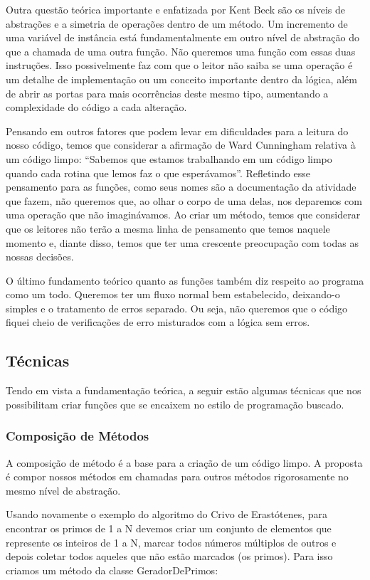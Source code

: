 Outra questão teórica importante e enfatizada por Kent Beck são os níveis de abstrações e a simetria de operações dentro de um método. Um incremento de uma variável de instância está fundamentalmente em outro nível de abstração do que a chamada de uma outra função. Não queremos uma função com essas duas instruções. Isso possivelmente faz com que o leitor não saiba se uma operação é um detalhe de implementação ou um conceito importante dentro da lógica, além de abrir as portas para mais ocorrências deste mesmo tipo, aumentando a complexidade do código a cada alteração.
	
Pensando em outros fatores que podem levar em dificuldades para a leitura do nosso código, temos que considerar a afirmação de Ward Cunningham relativa à um código limpo: “Sabemos que estamos trabalhando em um código limpo quando cada rotina que lemos faz o que esperávamos”. Refletindo esse pensamento para as funções, como seus nomes são a documentação da atividade que fazem, não queremos que, ao olhar o corpo de uma delas, nos deparemos com uma operação que não imaginávamos. Ao criar um método, temos que considerar que os leitores não terão a mesma linha de pensamento que temos naquele momento e, diante disso, temos que ter uma crescente preocupação com todas as nossas decisões.
	
O último fundamento teórico quanto as funções também diz respeito ao programa como um todo. Queremos ter um fluxo normal bem estabelecido, deixando-o simples e o tratamento de erros separado. Ou seja, não queremos que o código fiquei cheio de verificações de erro misturados com a lógica sem erros.
	
\subsection{Técnicas}
Tendo em vista a fundamentação teórica, a seguir estão algumas técnicas que nos possibilitam criar funções que se encaixem no estilo de programação buscado.

\subsubsection{Composição de Métodos}
A composição de método é a base para a criação de um código limpo. A proposta é compor nossos métodos em chamadas para outros métodos rigorosamente no mesmo nível de abstração.
	
Usando novamente o exemplo do algoritmo do Crivo de Erastótenes, para encontrar os primos de 1 a N devemos criar um conjunto de elementos que represente os inteiros de 1 a N, marcar todos números múltiplos de outros e depois coletar todos aqueles que não estão marcados (os primos). Para isso criamos um método da classe GeradorDePrimos:

